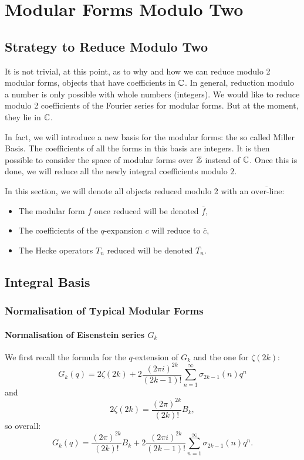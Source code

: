 \section{Modular Forms Modulo Two}
\subsection{Strategy to Reduce Modulo Two}
It is not trivial, at this point, as to why and how we can reduce modulo 2 modular forms, objects that have coefficients in $\mathbb{C}$.
In general, reduction modulo a number is only possible with whole numbers (integers).
We would like to reduce modulo 2 coefficients of the Fourier series for modular forms.
But at the moment, they lie in $\mathbb{C}$.

In fact, we will introduce a new basis for the modular forms: the so called Miller Basis.
The coefficients of all the forms in this basis are integers. It is then possible to consider the space of modular forms over $\mathbb{Z}$ instead of $\mathbb{C}$.
Once this is done, we will reduce all the newly integral coefficients modulo $2$.

In this section, we will denote all objects reduced modulo 2 with an $\overline{\text{over-line}}$:
\begin{itemize}
	\item The modular form $f$ once reduced will be denoted $\overline{f}$,	\item The coefficients of the $q$-expansion $c$ will reduce to $\overline{c}$,
	\item The Hecke operators $T_n$ reduced will be denoted $\overline{T_n}$.
\end{itemize}

\subsection{Integral Basis}
\subsubsection{Normalisation of Typical Modular Forms}
\paragraph{Normalisation of Eisenstein series $G_k$}
We first recall the formula for the $q$-extension of $G_k$ and the one for $\zeta(2k)$:
$$
G_k(q) = 2\zeta(2k) + 2 \frac{{(2 \pi i)}^{2k}}{(2k-1)!} \sum_{n=1}^{\infty} \sigma_{2k-1}(n)q^n
$$
and
$$
2\zeta(2k) = \frac{(2\pi)^{2k}}{(2k)!}B_k,
$$
so overall:
$$
G_k(q) = \frac{(2\pi)^{2k}}{(2k)!}B_k + 2 \frac{{(2 \pi i)}^{2k}}{(2k-1)!} \sum_{n=1}^{\infty} \sigma_{2k-1}(n)q^n.
$$

